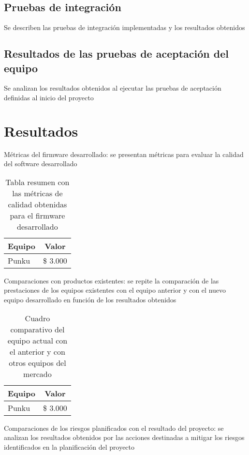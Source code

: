 \subsection{Pruebas de integración}

Se describen las pruebas de integración implementadas y los resultados obtenidos

\subsection{Resultados de las pruebas de aceptación del equipo}

Se analizan los resultados obtenidos al ejecutar las pruebas de aceptación definidas al inicio del proyecto

\section{Resultados}
\label{sec:Resultados}

Métricas del firmware desarrollado: se presentan métricas para evaluar la calidad del software desarrollado

\begin{table}[h]
	\centering
	\caption{Tabla resumen con las métricas de calidad obtenidas para el firmware desarrollado}
	\begin{tabular}{l c}    
		\toprule
		\textbf{Equipo} 	 & \textbf{Valor}\\
		\midrule
		Punku 				 & \$ 3.000\\
		\bottomrule
		\hline
	\end{tabular}
	\label{tab:MetricasFirmware}
\end{table}


Comparaciones con productos existentes: se repite la comparación de las prestaciones de los equipos existentes con el equipo anterior y con el nuevo equipo desarrollado en función de los resultados obtenidos

\begin{table}[h]
	\centering
	\caption{Cuadro comparativo del equipo actual con el anterior y con otros equipos del mercado}
	\begin{tabular}{l c}    
		\toprule
		\textbf{Equipo} 	 & \textbf{Valor}\\
		\midrule
		Punku 				 & \$ 3.000\\
		\bottomrule
		\hline
	\end{tabular}
	\label{tab:ComparacionNuevo}
\end{table}

Comparaciones de los riesgos planificados con el resultado del proyecto: se analizan los resultados obtenidos por las acciones destinadas a mitigar los riesgos identificados en la planificación del proyecto
